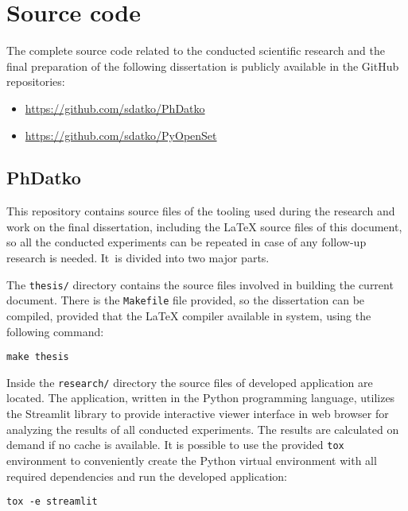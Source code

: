 \chapter{Source code}
\label{chapter:source-code}

The complete source code related to the conducted scientific research and the final preparation of the following dissertation is publicly available in the GitHub repositories:
\begin{itemize}
    \item \url{https://github.com/sdatko/PhDatko}
    \item \url{https://github.com/sdatko/PyOpenSet}
\end{itemize}


\section{PhDatko}
\label{section:phdatko}

This repository contains source files of the tooling used during the research and work on the final dissertation, including the \LaTeX{} source files of this document, so all the conducted experiments can be repeated in case of any follow-up research is needed. It~is divided into two major parts.

The \texttt{thesis/} directory contains the source files involved in building the current document. There is the \texttt{Makefile} file provided, so the dissertation can be compiled, provided that the \LaTeX{} compiler available in system, using the following command:
\vspace{-\parskip}
\begin{verbatim}
make thesis
\end{verbatim}

Inside the \texttt{research/} directory the source files of developed application are located. The application, written in the Python programming language, utilizes the Streamlit library to provide interactive viewer interface in web browser for analyzing the results of all conducted experiments. The results are calculated on demand if no cache is available. It is possible to use the provided \texttt{tox} environment to conveniently create the Python virtual environment with all required dependencies and run the developed application:
\vspace{-\parskip}
\begin{verbatim}
tox -e streamlit
\end{verbatim}


